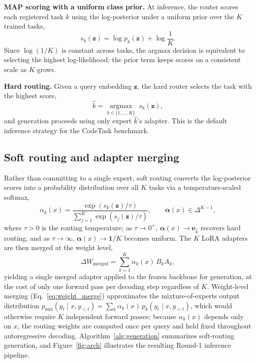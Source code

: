 \textbf{MAP scoring with a uniform class prior.} At inference, the router scores each registered task $k$ using the log-posterior under a uniform prior over the $K$ trained tasks,
\begin{equation}
    s_k(\mathbf{z}) = \log p_k(\mathbf{z}) + \log \frac{1}{K}.
    \label{eq:snorm}
\end{equation}
Since $\log(1/K)$ is constant across tasks, the argmax decision is equivalent to selecting the highest log-likelihood; the prior term keeps scores on a consistent scale as $K$ grows.

\textbf{Hard routing.} Given a query embedding $\mathbf{z}$, the hard router selects the task with the highest score,
\begin{equation}
    \hat{k} = \operatorname*{argmax}_{k \in \{1,\ldots,K\}} \; s_k(\mathbf{z}),
    \label{eq:routing}
\end{equation}
and generation proceeds using only expert $\hat{k}$'s adapter. This is the default inference strategy for the CodeTask benchmark.

\subsection{Soft routing and adapter merging}
\label{sec:soft_routing}

Rather than committing to a single expert, soft routing converts the log-posterior scores into a probability distribution over all $K$ tasks via a temperature-scaled softmax,
\begin{equation}
    \alpha_k(x) = \frac{\exp\!\left(s_k(\mathbf{z}) / \tau\right)}{\sum_{j=1}^K \exp\!\left(s_j(\mathbf{z}) / \tau\right)}, \qquad \bm{\alpha}(x) \in \Delta^{K-1},
    \label{eq:alpha}
\end{equation}
where $\tau>0$ is the routing temperature; as $\tau\to0^+$, $\bm{\alpha}(x)\to\mathbf{e}_{\hat{k}}$ recovers hard routing, and as $\tau\to\infty$, $\bm{\alpha}(x)\to\mathbf{1}/K$ becomes uniform. The $K$ LoRA adapters are then merged at the weight level,
\begin{equation}
    \Delta W_{\mathrm{merged}} = \sum_{k=1}^K \alpha_k(x)\, B_k A_k,
    \label{eq:weight_merge}
\end{equation}
yielding a single merged adapter applied to the frozen backbone for generation, at the cost of only one forward pass per decoding step regardless of $K$. Weight-level merging (Eq.~\eqref{eq:weight_merge}) approximates the mixture-of-experts output distribution $p_{\mathrm{mix}}(y_t\mid x,y_{<t})=\sum_k \alpha_k(x)\,p_k(y_t\mid x,y_{<t})$, which would otherwise require $K$ independent forward passes; because $\alpha_k(x)$ depends only on $x$, the routing weights are computed once per query and held fixed throughout autoregressive decoding. Algorithm~\ref{alg:generation} summarizes soft-routing generation, and Figure~\ref{fig:arch} illustrates the resulting Round-1 inference pipeline.

